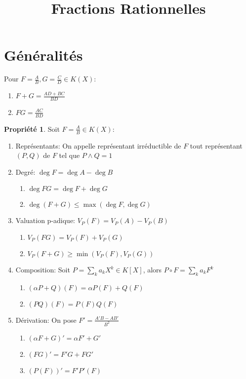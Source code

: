 \documentclass[fleqn]{article}
\title{Fractions Rationnelles}
\date{}
\theoremstyle{definition} \newtheorem*{defi}{D\'efinition}
\theoremstyle{definition} \newtheorem*{theo}{Th\'eor\`eme}
\theoremstyle{definition} \newtheorem*{coro}{Corollaire}
\theoremstyle{definition} \newtheorem*{nota}{Notation}
\theoremstyle{remark} \newtheorem*{rqs}{Remarques}
\theoremstyle{definition} \newtheorem*{prop}{Propri\'et\'e}
\begin{document}
\maketitle

\section{G\'en\'eralit\'es}
Pour $F = \frac{A}{B}, G = \frac{C}{D} \in K(X)$:
\begin{enumerate}
	\item $F+G = \frac{AD+BC}{BD}$
	\item $FG = \frac{AC}{BD}$
\end{enumerate}
\begin{prop} Soit $F = \frac{A}{B} \in K(X)$:
	\begin{enumerate}
		\item Repr\'esentants: On appelle repr\'esentant irr\'eductible de $F$ tout repr\'esentant $(P,Q)$ de $F$ tel que $P \land Q=1$
		\item Degr\'e: $\deg F = \deg A - \deg B$
			\begin{enumerate}
				\item $\deg FG = \deg F + \deg G$
				\item $\deg (F+G) \leq \max(\deg F, \deg G)$
			\end{enumerate}
		\item Valuation p-adique: $V_P(F) = V_P(A) - V_P(B)$
			\begin{enumerate}
				\item $V_P(FG) = V_P(F) + V_P(G)$
				\item $V_P(F+G) \geq \min(V_P(F), V_P(G))$
			\end{enumerate}
		\item Composition: Soit $P = \sum_k a_kX^k \in K[X]$, alors $P \circ F = \sum_k a_k F^k$
			\begin{enumerate}
				\item $(\alpha P + Q)(F) = \alpha P(F) + Q(F)$
				\item $(PQ)(F) = P(F)Q(F)$
			\end{enumerate}
		\item D\'erivation: On pose $F' = \frac{A'B - AB'}{B^2}$
			\begin{enumerate}
				\item $(\alpha F + G)' = \alpha F' + G'$
				\item $(FG)' = F'G + FG'$
				\item $(P(F))' = F'P'(F)$
			\end{enumerate}
	\end{enumerate}
\end{prop}
\end{document}
